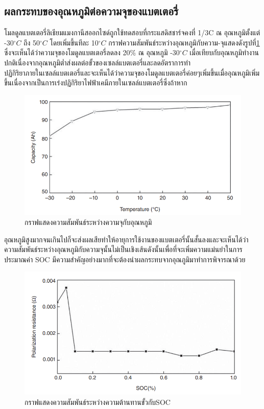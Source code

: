 \subsection{ผลกระทบของอุณหภูมิต่อความจุของแบตเตอรี่}
โมลดูลแบตเตอรี่ลิเธียมแมงกานีสออกไซด์ถูกใช้ทดสอบที่กระแสดิสชาร์จคงที่ 1/3C ณ อุณหภูมิตั้งแต่ -30$^{\circ}C$ ถึง 50$^{\circ}C$ โดยเพิ่มขึ้นทีละ 10$^{\circ}C$  กราฟความสัมพันธ์ระหว่างอุณหภูมิกับความ-จุแสดงดังรูปที่\ref{fig:Ah Vs Temp} ซึ่งจะเห็นได้ว่าความจุของโมดูลแบตเตอรี่ลดลง 20\% ณ อุณหภูมิ -30$^{\circ}C$ เมื่อเทียบกับอุณหภูมิทำงานปกติเนื่องจากอุณหภูมิต่ำส่งผลต่อขั้วของเซลล์แบตเตอรี่และลดอัตราการทำ\\
ปฏิกิริยาภายในเซลล์แบตเตอรี่และจะเห็นได้ว่าความจุของโมดูลแบตเตอรี่ค่อยๆเพิ่มขึ้นเมื่ออุณหภูมิเพิ่มขึ้นเนื่องจากเป็นการเร่งปฏิกิริยาไฟฟ้าเคมีภายในเซลล์แบตเตอรี่ซึ่งถ้าหาก
\begin{center}
	\begin{figure}[H]
		\includegraphics[width=0.6\linewidth]{Chapters/img/Current_vs_Temp.png}
			\centering
			\captionsetup{justification=centering,margin=2cm}
			\caption{กราฟแสดงความสัมพันธ์ระหว่างความจุกับอุณหภูมิ}
			\label{fig:Ah Vs Temp}
	\end{figure}
\end{center}
อุณหภูมิสูงมากจนเกินไปก็จะส่งผลเสียทำให้อายุการใช้งานของแบตเตอรี่นั้นสั้นลงและจะเห็นได้ว่าความสัมพันธ์ระหว่างอุณหภูมิกับความจุนั้นไม่เป็นเชิงเส้นดังนั้นเพื่อที่จะเพิ่มความแม่นยำในการประมาณค่า SOC มีความสำคัญอย่างมากที่จะต้องนำผลกระทบจากอุณภูมิมาทำการพิจารณาด้วย
\begin{center}
	\begin{figure}[H]
		\includegraphics[width=0.6\linewidth]{Chapters/img/Pol_Resistance_vs_SOC.png}
			\centering
			\captionsetup{justification=centering,margin=2cm}
			\caption{กราฟแสดงความสัมพันธ์ระหว่างความต้านทานขั้วกับSOC}
	\end{figure}
\end{center}
